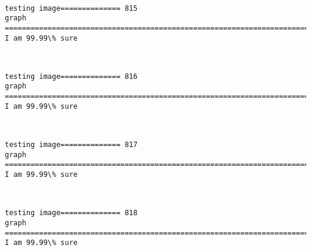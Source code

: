 \documentclass[11pt]{article}
\begin{document}
    \begin{center}
    \end{center}
    { \hspace*{\fill} \\}
    
    \begin{Verbatim}[commandchars=\\\{\}]
testing image============== 815
graph
============================================================================
I am 99.99\% sure

    \end{Verbatim}

    \begin{center}
    \end{center}
    { \hspace*{\fill} \\}
    
    \begin{Verbatim}[commandchars=\\\{\}]
testing image============== 816
graph
============================================================================
I am 99.99\% sure

    \end{Verbatim}

    \begin{center}
    \end{center}
    { \hspace*{\fill} \\}
    
    \begin{Verbatim}[commandchars=\\\{\}]
testing image============== 817
graph
============================================================================
I am 99.99\% sure

    \end{Verbatim}

    \begin{center}
    \end{center}
    { \hspace*{\fill} \\}
    
    \begin{Verbatim}[commandchars=\\\{\}]
testing image============== 818
graph
============================================================================
I am 99.99\% sure

    \end{Verbatim}
\end{document}
